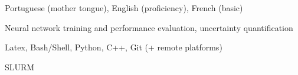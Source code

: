 
\begin{cvskills}

{Portuguese (mother tongue), English (proficiency), French (basic)}

{Neural network training and performance evaluation, uncertainty quantification}

{Latex, Bash/Shell, Python, C++, Git (+ remote platforms)}

{SLURM}

\end{cvskills}